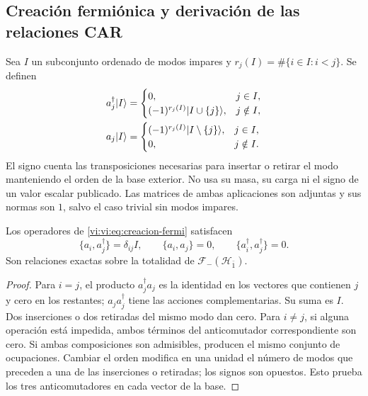 \subsection{Creación fermiónica y derivación de las relaciones CAR}
\label{vi:vi:subsec:car-construccion}

Sea \(I\) un subconjunto ordenado de modos impares y
\(r_j(I)=\#\{i\in I:i<j\}\). Se definen
\begin{align}
 a_j^\dagger|I\rangle&=
 \begin{cases}
 0,&j\in I,\\
 (-1)^{r_j(I)}|I\cup\{j\}\rangle,&j\notin I,
 \end{cases}\notag\\
 a_j|I\rangle&=
 \begin{cases}
 (-1)^{r_j(I)}|I\setminus\{j\}\rangle,&j\in I,\\
 0,&j\notin I.
 \end{cases}
 \label{vi:vi:eq:creacion-fermi}
\end{align}
El signo cuenta las transposiciones necesarias para insertar o retirar
el modo manteniendo el orden de la base exterior. No usa su masa,
su carga ni el signo de un valor escalar publicado. Las matrices de
ambas aplicaciones son adjuntas y sus normas son \(1\), salvo el
caso trivial sin modos impares.

\begin{theorem}
\label{vi:vi:thm:car-construidas}
Los operadores de \eqref{vi:vi:eq:creacion-fermi} satisfacen
\[
 \{a_i,a_j^\dagger\}=\delta_{ij}I,\qquad
 \{a_i,a_j\}=0,\qquad
 \{a_i^\dagger,a_j^\dagger\}=0.
\]
Son relaciones exactas sobre la totalidad de
\(\mathcal F_-(\mathcal H_{\bar1})\).
\end{theorem}
\begin{proof}
Para \(i=j\), el producto \(a_j^\dagger a_j\) es la identidad
en los vectores que contienen \(j\) y cero en los restantes;
\(a_ja_j^\dagger\) tiene las acciones complementarias. Su suma
es \(I\). Dos inserciones o dos retiradas del mismo modo dan cero.
Para \(i\ne j\), si alguna operación está impedida, ambos términos
del anticomutador correspondiente son cero. Si ambas composiciones
son admisibles, producen el mismo conjunto de ocupaciones. Cambiar
el orden modifica en una unidad el número de modos que preceden a
una de las inserciones o retiradas; los signos son opuestos. Esto
prueba los tres anticomutadores en cada vector de la base.
\end{proof}

